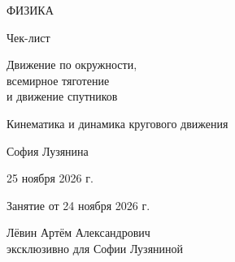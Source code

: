 \documentclass[a4paper,12pt]{article}
\begin{document}
\hypersetup{pageanchor=false}
\begin{titlepage}
\centering\color{textgray}
\vspace*{22mm}
{\Large\color{darkaccent} ФИЗИКА\par}
\vspace{13mm}
{\Huge Чек-лист\par}
\vspace{9mm}
{\LARGE\color{accent} Движение по окружности,\\ всемирное тяготение\\ и движение спутников\par}
\vspace{12mm}
{\large Кинематика и динамика кругового движения\par}
\vfill
{\large София Лузянина\par}
\vspace{8mm}
{\large 25 ноября 2026 г.\par}
{\small Занятие от 24 ноября 2026 г.\par}
\vspace{12mm}
{\small Лёвин Артём Александрович\\ эксклюзивно для Софии Лузяниной\par}
\vspace{16mm}
\vspace{2mm}
\end{titlepage}
\setcounter{page}{1}
\hypersetup{pageanchor=true}
\end{document}
